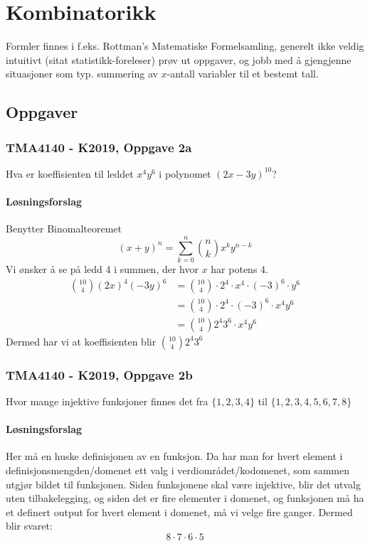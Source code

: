 \section{Kombinatorikk}

\noindent Formler finnes i f.eks. Rottman's Matematiske Formelsamling, generelt ikke veldig intuitivt (sitat statistikk-foreleser)
prøv ut oppgaver, og jobb med å gjengjenne situasjoner som typ. summering av $x$-antall variabler til et bestemt tall.

\subsection{Oppgaver}
\subsubsection{TMA4140 - K2019, Oppgave 2a}
Hva er koeffisienten til leddet $x^4 y^6$ i polynomet $(2x-3y)^{10}$?

\paragraph*{Løsningsforslag}

Benytter Binomalteoremet
\[
(x+y)^n=\sum_{k=0}^{n}\binom{n}{k} x^k y^{n-k}
\]
Vi ønsker å se på ledd 4 i summen, der hvor $x$ har potens 4.
\begin{align}
    \binom{10}{4}(2x)^4(-3y)^6 &= \binom{10}{4}\cdot 2^4 \cdot x^4 \cdot (-3)^6 \cdot y^6\\
    &= \binom{10}{4}\cdot 2^4 \cdot (-3)^6 \cdot x^4 y^6\\
    &= \binom{10}{4} 2^4 3^6 \cdot x^4 y^6
\end{align}
Dermed har vi at koeffisienten blir $\binom{10}{4} 2^4 3^6 $

\subsubsection{TMA4140 - K2019, Oppgave 2b}
Hvor mange injektive funksjoner finnes det fra $\{1,2,3,4\}$ til $\{1,2,3,4,5,6,7,8\}$

\paragraph*{Løsningsforslag} 

Her må en huske definisjonen av en funksjon. Da har man for hvert element i definisjonsmengden/domenet 
ett valg i verdiområdet/kodomenet, som sammen utgjør bildet til funksjonen. Siden funksjonene skal være
injektive, blir det utvalg uten tilbakelegging, og siden det er fire elementer i domenet, og funksjonen
må ha et definert output for hvert element i domenet, må vi velge fire ganger. Dermed blir svaret:
\[
8\cdot 7 \cdot 6\cdot 5   
\]